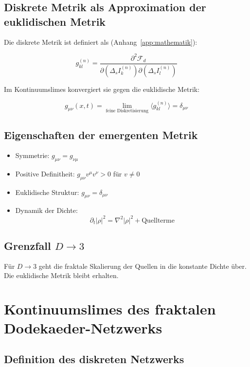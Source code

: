 \subsection{Diskrete Metrik als Approximation der euklidischen Metrik}
\label{sub:kontinuumslimes_metrik_diskret}

Die diskrete Metrik ist definiert als (Anhang~\ref{app:mathematik}):

\[
g_{kl}^{(n)} = \frac{\partial^2 \mathcal{F}_d}{\partial (\Delta_s I_k^{(n)}) \partial (\Delta_s I_l^{(n)})}
\]

Im Kontinuumslimes konvergiert sie gegen die euklidische Metrik:

\[
g_{\mu\nu}(x, t) = \lim_{\text{feine Diskretisierung}} \langle g_{kl}^{(n)} \rangle = \delta_{\mu\nu}
\]

\subsection{Eigenschaften der emergenten Metrik}
\label{sub:kontinuumslimes_metrik_eigenschaften}

\begin{itemize}
    \item Symmetrie: \( g_{\mu\nu} = g_{\nu\mu} \)
    \item Positive Definitheit: \( g_{\mu\nu} v^\mu v^\nu > 0 \) für \( v \neq 0 \)
    \item Euklidische Struktur: \( g_{\mu\nu} = \delta_{\mu\nu} \)
    \item Dynamik der Dichte:
          \[
          \partial_t |\rho|^2 = \nabla^2 |\rho|^2 + \text{Quellterme}
          \]
\end{itemize}

\subsection{Grenzfall \( D \to 3 \)}
\label{sub:kontinuumslimes_grenzfall_d}

Für \( D \to 3 \) geht die fraktale Skalierung der Quellen in die konstante Dichte über. Die euklidische Metrik bleibt erhalten.

\section{Kontinuumslimes des fraktalen Dodekaeder-Netzwerks}
\label{app:kontinuumslimes_dodekaeder_netzwerk}

\subsection{Definition des diskreten Netzwerks}
\label{sub:kontinuumslimes_netz_def}

